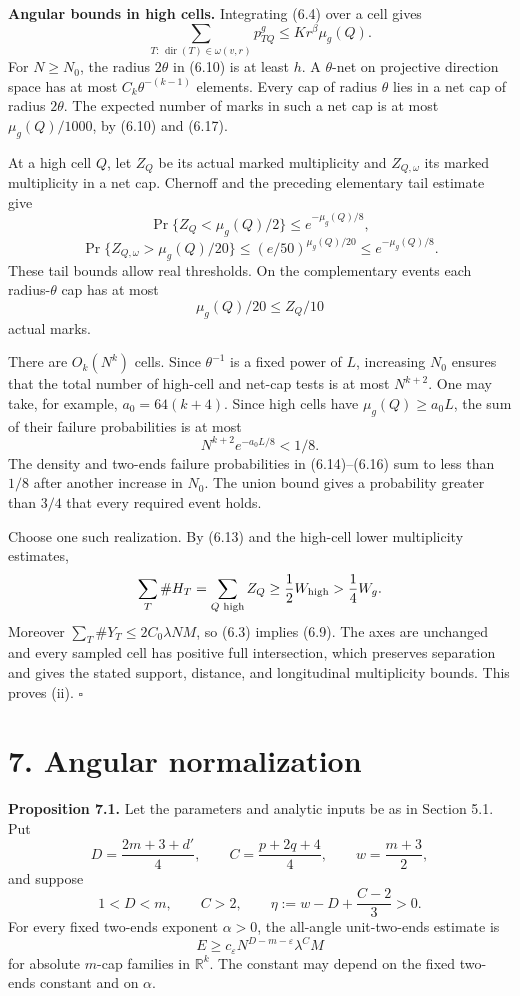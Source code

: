 \documentclass[
  11pt,
  a4paper,
]{article}
\begin{document}
\textbf{Angular bounds in high cells.} Integrating (6.4) over a cell
gives \[\sum_{T:\,\operatorname{dir}(T)\in\omega(v,r)}p^g_{TQ}
 \le Kr^\beta\mu_g(Q).
 \tag{6.17}\label{eq:6.17}\] For \(N\ge N_0\), the radius \(2\theta\) in (6.10) is at
least \(h\). A \(\theta\)-net on projective direction space has at most
\(C_k\theta^{-(k-1)}\) elements. Every cap of radius \(\theta\) lies in
a net cap of radius \(2\theta\). The expected number of marks in such a
net cap is at most \(\mu_g(Q)/1000\), by (6.10) and (6.17).

At a high cell \(Q\), let \(Z_Q\) be its actual marked multiplicity and
\(Z_{Q,\omega}\) its marked multiplicity in a net cap. Chernoff and the
preceding elementary tail estimate give
\[\Pr\{Z_Q<\mu_g(Q)/2\}\le e^{-\mu_g(Q)/8},\]
\[\Pr\{Z_{Q,\omega}>\mu_g(Q)/20\}
 \le(e/50)^{\mu_g(Q)/20}
 \le e^{-\mu_g(Q)/8}.
 \tag{6.18}\label{eq:6.18}\] These tail bounds allow real thresholds. On the
complementary events each radius-\(\theta\) cap has at most
\[\mu_g(Q)/20\le Z_Q/10\] actual marks.

There are \(O_k(N^k)\) cells. Since \(\theta^{-1}\) is a fixed power of
\(L\), increasing \(N_0\) ensures that the total number of high-cell and
net-cap tests is at most \(N^{k+2}\). One may take, for example,
\(a_0=64(k+4)\). Since high cells have \(\mu_g(Q)\ge a_0L\), the sum of
their failure probabilities is at most \[N^{k+2}e^{-a_0L/8}<1/8.
 \tag{6.19}\label{eq:6.19}\] The density and two-ends failure probabilities in
(6.14)--(6.16) sum to less than \(1/8\) after another increase in
\(N_0\). The union bound gives a probability greater than \(3/4\) that
every required event holds.

Choose one such realization. By (6.13) and the high-cell lower
multiplicity estimates, \[\sum_T\#H_T
 =\sum_{Q\text{ high}}Z_Q
 \ge\frac12W_{\rm high}>\frac14W_g.\] Moreover
\(\sum_T\#Y_T\le2C_0\lambda NM\), so (6.3) implies (6.9). The axes are
unchanged and every sampled cell has positive full intersection, which
preserves separation and gives the stated support, distance, and
longitudinal multiplicity bounds. This proves (ii). \(\square\)

\hypertarget{angular-normalization}{%
\section{7. Angular normalization}\label{angular-normalization}}

\textbf{Proposition 7.1.} Let the parameters and analytic inputs be as
in Section 5.1. Put \[
 D=\frac{2m+3+d'}4,\qquad C=\frac{p+2q+4}4,
 \qquad w=\frac{m+3}2,
\] and suppose \[
 1<D<m,\qquad C>2,\qquad
 \eta:=w-D+\frac{C-2}{3}>0.
\] For every fixed two-ends exponent \(\alpha>0\), the all-angle
unit-two-ends estimate is \[
 E\ge c_\varepsilon N^{D-m-\varepsilon}\lambda^C M
\] for absolute \(m\)-cap families in \(\mathbb R^k\). The constant may
depend on the fixed two-ends constant and on \(\alpha\).
\end{document}

